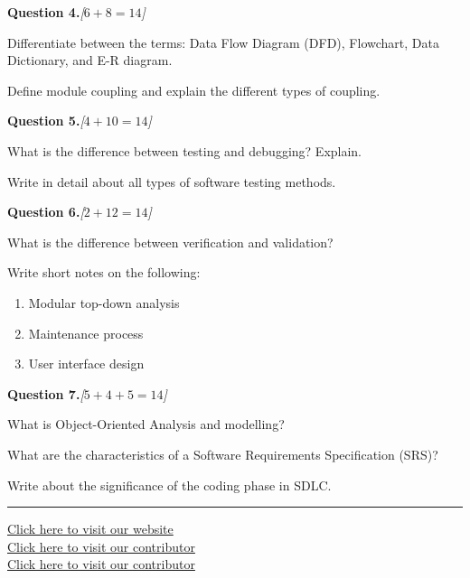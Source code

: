 \documentclass[11pt,a4paper]{article}
\newcommand{\pts}[1]{\hfill   \textit{[#1]}}
\begin{document}
\bigskip




\noindent   \textbf{Question 4.}\pts{$6+8=14$}

\begin{parts}
  \item Differentiate between the terms: Data Flow Diagram (DFD), Flowchart, Data Dictionary, and E-R diagram.
  \item Define module coupling and explain the different types of coupling.
\end{parts}

\bigskip




\noindent   \textbf{Question 5.}\pts{$4+10=14$}

\begin{parts}
  \item What is the difference between testing and debugging? Explain.
  \item Write in detail about all types of software testing methods.
\end{parts}

\bigskip




\noindent   \textbf{Question 6.}\pts{$2+12=14$}

\begin{parts}
  \item What is the difference between verification and validation?
  \item Write short notes on the following:
  
\begin{enumerate}[label=(\roman*)]
    \item Modular top-down analysis
    \item Maintenance process
    \item User interface design
  \end{enumerate}
\end{parts}

\bigskip




\noindent   \textbf{Question 7.}\pts{$5+4+5=14$}

\begin{parts}
  \item What is Object-Oriented Analysis and modelling?
  \item What are the characteristics of a Software Requirements Specification (SRS)?
  \item Write about the significance of the coding phase in SDLC.
\end{parts}

\vfill
\rule{\linewidth}{0.4pt}

\begin{center}\small
\href{https://bhu-exam.vercel.app/}{Click here to visit our website}\\[4pt]\href{https://me-aryan.vercel.app/}{Click here to visit our contributor}\\[4pt]\href{https://quashan-me.vercel.app/}{Click here to visit our contributor}
\end{center}
\end{document}
